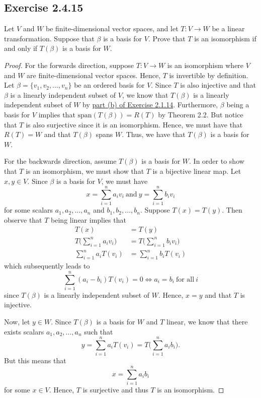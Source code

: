 \subsection*{Exercise 2.4.15} Let \( V  \) and \( W  \) be finite-dimensional vector spaces, and let \( T: V \to W  \) be a linear transformation. Suppose that \( \beta \) is a basis for \( V  \). Prove that \( T  \) is an isomorphism if and only if \( T(\beta)  \) is a basis for \( W  \).
\begin{proof}
    For the forwards direction, suppose \( T: V \to W   \) is an isomorphism where \( V  \) and \( W  \) are finite-dimensional vector spaces. Hence, \( T  \) is invertible by definition. Let \( \beta = \{ {v}_{1}, {v}_{2}, \dots, {v}_{n} \}  \) be an ordered basis for \( V  \). Since \( T  \) is also injective and that \( \beta \) is a linearly independent subset of \( V  \), we know that \( T(\beta) \) is a linearly independent subset of \( W  \) by {\hyperref[Exercise 2.1.14]{part (b) of Exercise 2.1.14}}. Furthermore, \( \beta  \) being a basis for \( V  \) implies that \( \text{span}(T(\beta)) = R(T)  \) by Theorem 2.2. But notice that \( T  \) is also surjective since it is an isomorphism. Hence, we must have that  \( R(T) = W  \) and that \( T(\beta) \) spans \( W  \). Thus, we have that \( T(\beta) \) is a basis for \( W  \).

    For the backwards direction, assume \( T(\beta) \) is a basis for \( W  \). In order to show that \( T  \) is an isomorphism, we must show that \( T  \) is a bijective linear map. Let \( x,y \in V  \). Since \( \beta \) is a basis for \( V  \), we must have
    \[  x = \sum_{ i=1  }^{ n } {a}_{i} {v}_{i} \ \text{and} \ y = \sum_{ i=1 }^{ n }{b}_{i} {v}_{i} \]
    for some scalars \( {a}_{1}, {a}_{2}, \dots, {a}_{n} \) and \( {b}_{1}, {b}_{2}, \dots, {b}_{n} \). Suppose \( T(x) = T(y) \). Then observe that \( T  \) being linear implies that
    \begin{align*}
        T(x) &= T(y) \\
        T \Big( \sum_{ i=1 }^{ n } {a}_{i} {v}_{i}  \Big) &= T \Big( \sum_{ i=1 }^{ n }{b}_{i} {v}_{i} \Big) \\
                                             \sum_{ i=1 }^{ n } {a}_{i} T({v}_{i})   &= \sum_{ i=1 }^{ n } {b}_{i} T({v}_{i})
    \end{align*}
    which subsequently leads to 
    \[  \sum_{ i=1 }^{ n } ({a}_{i} - {b}_{i}) T({v}_{i}) = 0 \iff {a}_{i} = {b}_{i} \ \text{for all} \ i  \]
    since \( T(\beta) \) is a linearly independent subset of \( W  \). Hence, \( x = y  \) and that \( T  \) is injective.

    Now, let \( y \in W  \). Since \( T(\beta) \) is a basis for \( W  \) and \( T  \) linear, we know that there exists scalars \( {a}_{1},{a}_{2}, \dots, {a}_{n} \) such that 
    \[  y = \sum_{ i=1 }^{ n } {a}_{i} T({v}_{i})  = T \Big( \sum_{ i=1 }^{ n } {a}_{i} {b}_{i} \Big).  \]
    But this means that
    \[ x = \sum_{ i=1 }^{ n } {a}_{i} {b}_{i}   \]
    for some \( x \in V  \). Hence, \( T  \) is surjective and thus \( T  \) is an isomorphism.
\end{proof}

